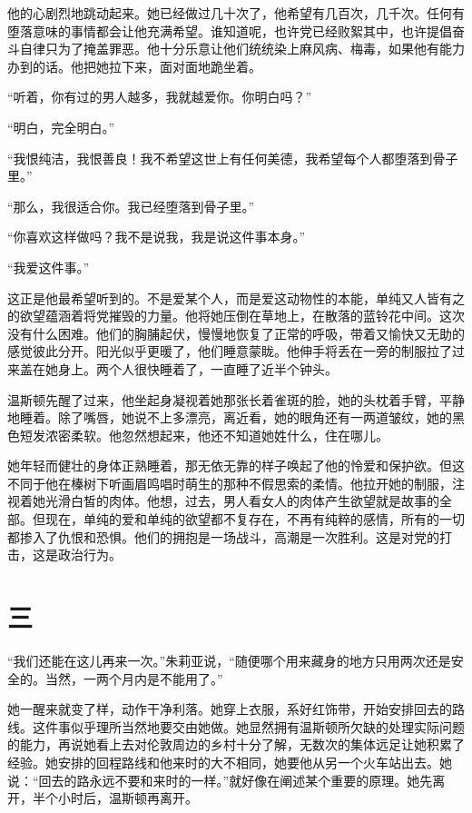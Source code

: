 他的心剧烈地跳动起来。她已经做过几十次了，他希望有几百次，几千次。任何有堕落意味的事情都会让他充满希望。谁知道呢，也许党已经败絮其中，也许提倡奋斗自律只为了掩盖罪恶。他十分乐意让他们统统染上麻风病、梅毒，如果他有能力办到的话。他把她拉下来，面对面地跪坐着。

``听着，你有过的男人越多，我就越爱你。你明白吗？''

``明白，完全明白。''

``我恨纯洁，我恨善良！我不希望这世上有任何美德，我希望每个人都堕落到骨子里。''

``那么，我很适合你。我已经堕落到骨子里。''

``你喜欢这样做吗？我不是说我，我是说这件事本身。''

``我爱这件事。''

这正是他最希望听到的。不是爱某个人，而是爱这动物性的本能，单纯又人皆有之的欲望蕴涵着将党摧毁的力量。他将她压倒在草地上，在散落的蓝铃花中间。这次没有什么困难。他们的胸脯起伏，慢慢地恢复了正常的呼吸，带着又愉快又无助的感觉彼此分开。阳光似乎更暖了，他们睡意蒙眬。他伸手将丢在一旁的制服拉了过来盖在她身上。两个人很快睡着了，一直睡了近半个钟头。

温斯顿先醒了过来，他坐起身凝视着她那张长着雀斑的脸，她的头枕着手臂，平静地睡着。除了嘴唇，她说不上多漂亮，离近看，她的眼角还有一两道皱纹，她的黑色短发浓密柔软。他忽然想起来，他还不知道她姓什么，住在哪儿。

她年轻而健壮的身体正熟睡着，那无依无靠的样子唤起了他的怜爱和保护欲。但这不同于他在榛树下听画眉鸣唱时萌生的那种不假思索的柔情。他拉开她的制服，注视着她光滑白皙的肉体。他想，过去，男人看女人的肉体产生欲望就是故事的全部。但现在，单纯的爱和单纯的欲望都不复存在，不再有纯粹的感情，所有的一切都掺入了仇恨和恐惧。他们的拥抱是一场战斗，高潮是一次胜利。这是对党的打击，这是政治行为。

\section*{三}\label{ux5341ux4e00}

``我们还能在这儿再来一次。''朱莉亚说，``随便哪个用来藏身的地方只用两次还是安全的。当然，一两个月内是不能用了。''

她一醒来就变了样，动作干净利落。她穿上衣服，系好红饰带，开始安排回去的路线。这件事似乎理所当然地要交由她做。她显然拥有温斯顿所欠缺的处理实际问题的能力，再说她看上去对伦敦周边的乡村十分了解，无数次的集体远足让她积累了经验。她安排的回程路线和他来时的大不相同，她要他从另一个火车站出去。她说：``回去的路永远不要和来时的一样。''就好像在阐述某个重要的原理。她先离开，半个小时后，温斯顿再离开。

